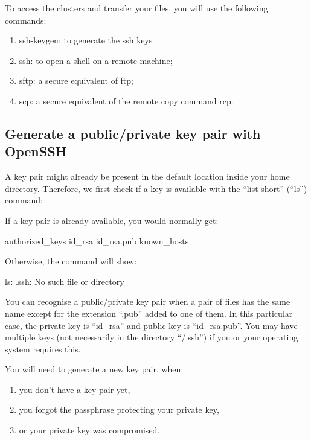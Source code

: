   To access the clusters and transfer your files, you will use the following commands:

  \begin{enumerate}
    \item  ssh-keygen: to generate the ssh keys
    \item  ssh: to open a shell on a remote machine;
    \item  sftp: a secure equivalent of ftp;
    \item  scp: a secure equivalent of the remote copy command rcp.
  \end{enumerate}

  \subsection{Generate a public/private key pair with OpenSSH}
  \label{sec:generate-key-pair-with-openssh}

  A key pair might already be present in the default location inside your home
  directory. Therefore, we first check if a key is available with the ``list
  short'' (``ls'')  command:

\begin{prompt}
\end{prompt}


  If a key-pair is already available, you would normally get:

\begin{prompt}
authorized_keys    id_rsa            id_rsa.pub         known_hosts
\end{prompt}

  Otherwise, the command will show:

\begin{prompt}
ls: .ssh: No such file or directory
\end{prompt}

  You can recognise a public/private key pair when a pair of files has the same
  name except for the extension ``.pub'' added to one of them. In this particular
  case, the private key is ``id\_rsa'' and public key is ``id\_rsa.pub''. You may
  have multiple keys (not necessarily in the directory ``\tilde/.ssh'') if you or
  your operating system requires this.

  You will need to generate a new key pair, when:
  \begin{enumerate}
    \item  you don't have a key pair yet,
    \item  you forgot the passphrase protecting your private key,
    \item  or your private key was compromised.
  \end{enumerate}

